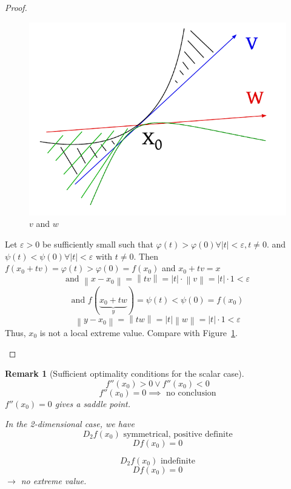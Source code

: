 \documentclass{article}
\newtheorem{remark}{Remark}  \numberwithin{remark}{section}
\newcommand{\norm}[1]{\left\|#1\right\|}
\newcommand{\card}[1]{\left|#1\right|}
\begin{document}
\begin{proof}
\begin{enumerate}
      \begin{figure}[t]
        \begin{center}
          \includegraphics{img/36_dir.pdf}
          \caption{$v$ and $w$}
          \label{img:vandw}
        \end{center}
      \end{figure}

      Let $\varepsilon > 0$ be sufficiently small such that $\varphi(t) > \varphi(0) \forall \card{t} < \varepsilon, t \neq 0$.
      and $\psi(t) < \psi(0) \forall \card{t} < \varepsilon$ with $t \neq 0$.
      Then $f(x_0 + tv) = \varphi(t) > \varphi(0) = f(x_0)$ and $x_0 + tv = x$
      \[ \text{and } \norm{x - x_0} = \norm{tv} = \card{t} \cdot \norm{v} = \card{t} \cdot 1 < \varepsilon \]
      \[ \text{and } f(\underbrace{x_0 + tw}_{y}) = \psi(t) < \psi(0) = f(x_0) \]
      \[ \norm{y - x_0} = \norm{tw} = \card{t} \norm{w} = \card{t} \cdot 1 < \varepsilon \]
      Thus, $x_0$ is not a local extreme value.
      Compare with Figure~\ref{img:vandw}.
  \end{enumerate}
\end{proof}

\begin{remark}[Sufficient optimality conditions for the scalar case]
  \[ f''(x_0) > 0 \lor f''(x_0) < 0 \]
  \[ f''(x_0) = 0 \implies \text{ no conclusion} \]
  $f''(x_0) = 0$ gives a saddle point.

  In the 2-dimensional case, we have
  \[ D_2 f(x_0) \text{ symmetrical, positive definite} \]
  \[ Df(x_0) = 0 \]

  \[ D_2 f(x_0) \text{ indefinite} \]
  \[ D f(x_0) = 0 \]
  $\rightarrow$ no extreme value.

\end{remark}
\end{document}
